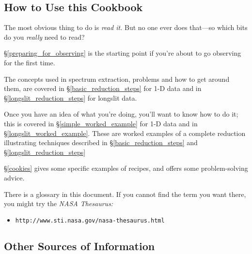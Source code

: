 \documentclass[twoside,11pt]{article}
\newcommand{\htmladdnormallink}[2]{#1}
\newcommand{\htmlref}[2]{#1}
\newcommand{\xlabel}[1]{}
\newcommand{\mlabel}[1]{\xlabel{#1}\label{#1}}
\newcommand{\scspec}[2]{#1}
\newcommand{\scspec}[2]{#2}
\begin{document}
\subsection{\mlabel{how_to_use}How to Use this Cookbook}

The most obvious thing to do is {\em read it.}  But no one ever
does that\scspec{---}{ - }so which bits do you {\em really} need to read?

\scspec{\S\ref{preparing_for_observing}}{\htmlref{Preparing for
Observing}{preparing_for_observing}} is the starting point if you're
about to go observing for the first time.

The concepts used in spectrum extraction, problems and how to get
around them, are covered in \scspec{\S\ref{basic_reduction_steps}}
{\htmlref{Basic Steps}{basic_reduction_steps}} for 1-D data and in
\scspec{\S\ref{longslit_reduction_steps}} {\htmlref{Longslit
reduction}{longslit_reduction_steps}} for longslit data.

Once you have an idea of what you're doing, you'll want to know how to
do it; this is covered in \scspec{\S\ref{simple_worked_example}}
{\htmlref{A Worked Example}{simple_worked_example}} for 1-D data and
in \scspec{\S\ref{longslit_worked_example}} {\htmlref{A 2-D Worked
Example}{longslit_worked_example}}. These are worked examples of a
complete reduction illustrating techniques described in
\scspec{\S\ref{basic_reduction_steps}}{\htmlref{Basic Steps}
{basic_reduction_steps}} and \scspec{\S\ref{longslit_reduction_steps}}
{\htmlref{Longslit reduction}{longslit_reduction_steps}}

\scspec{\S\ref{cookies}}{The \htmlref{Cookies}{cookies} section} gives
some specific examples of recipes, and offers some problem-solving advice.

There is a \htmlref{glossary}{glossary} in this document.
If you cannot find the term you want there, you might try the
{\sl NASA Thesaurus:}

\begin{itemize}

\item \scspec{{\tt http://www.sti.nasa.gov/nasa-thesaurus.html}}
      {\htmladdnormallink{\verb+http://www.sti.nasa.gov/nasa-thesaurus.html+}
      {http://www.sti.nasa.gov/nasa-thesaurus.html}}

\end{itemize}


\subsection{\mlabel{other_sources}Other Sources of Information}
\end{document}
